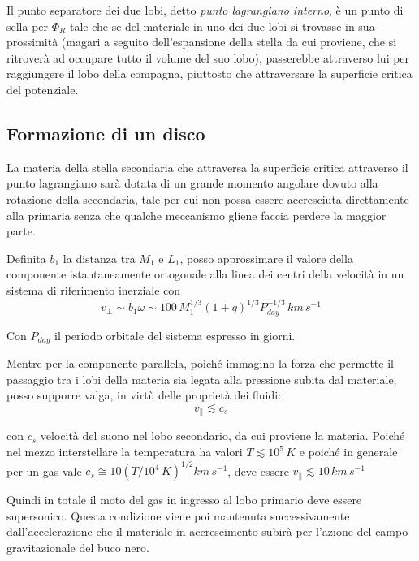 \documentclass[a4paperbi]{article}
\begin{document}
	Il punto separatore dei due lobi, detto \textit{punto lagrangiano interno}, è un punto di sella per $\Phi_R$ tale che se del materiale in uno dei due lobi si trovasse in sua prossimità (magari a seguito dell'espansione della stella da cui proviene, che si ritroverà ad occupare tutto il volume del suo lobo), passerebbe attraverso lui per raggiungere il lobo della compagna, piuttosto che attraversare la superficie critica del potenziale.

\subsection{Formazione di un disco}
	La materia della stella secondaria che attraversa la superficie critica attraverso il punto lagrangiano sarà dotata di un grande momento angolare dovuto alla rotazione della secondaria, tale per cui non possa essere accresciuta direttamente alla primaria senza che qualche meccanismo gliene faccia perdere la maggior parte.
	
	Definita $b_1$ la distanza tra $M_1$ e $L_1$, posso approssimare il valore della componente istantaneamente ortogonale alla linea dei centri della velocità in un sistema di riferimento inerziale con
	\begin{equation}
		v_\perp\sim b_1\omega\sim 100\,M_1^{1/3}(1+q)^{1/3}P^{-1/3}_{day}\,km\,s^{-1}
	\end{equation}  
	
	Con $P_{day}$ il periodo orbitale del sistema espresso in giorni.
	
	Mentre per la componente parallela, poiché immagino la forza che permette il passaggio tra i lobi della materia sia legata alla pressione subita dal materiale, posso supporre valga, in virtù delle proprietà dei fluidi:
	\begin{equation}
		v_\parallel \lesssim c_{s}
	\end{equation}
	
	con $c_{s}$ velocità del suono nel lobo secondario, da cui proviene la materia. Poiché nel mezzo interstellare la temperatura ha valori $T\lesssim10^5\,K$ e poiché in generale per un gas vale $c_s\cong10(T/10^4\,K)^{1/2}km\,s^{-1}$, deve essere $v_\parallel\lesssim10\,km\,s^{-1}$
	
	Quindi in totale il moto del gas in ingresso al lobo primario deve essere supersonico. Questa condizione viene poi mantenuta successivamente dall'accelerazione che il materiale in accrescimento subirà per l'azione del campo gravitazionale del buco nero.
	
\end{document}
